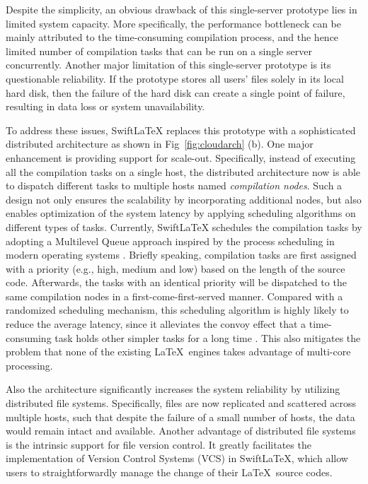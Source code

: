 \documentclass[sigconf]{acmart}
\begin{document}
Despite the simplicity, an obvious drawback of this single-server prototype lies in limited system capacity. More specifically, the performance bottleneck can be mainly attributed to the time-consuming compilation process, and the hence limited number of compilation tasks that can be run on a single server concurrently.
  Another major limitation of  this single-server prototype is its questionable reliability. If the prototype  stores all users' files solely in its local hard disk, then the failure of the hard disk can create a single point of failure, resulting in data loss or system unavailability. 



To address these issues, SwiftLaTeX replaces this prototype with a sophisticated distributed architecture as shown in Fig~\ref{fig:cloudarch} (b).
One major enhancement is providing support for scale-out. 
Specifically, instead of executing all the compilation tasks on a single host, the distributed architecture now is able to dispatch different tasks to multiple hosts named \textit{compilation nodes}. Such a design not only ensures the scalability by incorporating additional nodes, but also enables optimization of the system latency by applying scheduling algorithms on different types of tasks. 
Currently, SwiftLaTeX schedules the compilation tasks by adopting a Multilevel Queue approach inspired by the process scheduling in modern operating systems \cite{silberschatz2014operating} .
Briefly speaking, compilation tasks are first assigned with a priority (e.g., high, medium and low) based on the length of the source code.
Afterwards, the tasks with an identical priority will be dispatched to the same compilation nodes in a first-come-first-served manner. 
Compared with a randomized scheduling mechanism, this scheduling algorithm is highly likely to reduce the average latency, since it alleviates the convoy effect that a time-consuming task holds other simpler tasks for a long time \cite{lee2011improving}.
This also mitigates the problem that none of the existing \LaTeX\ engines takes advantage of multi-core processing.


Also the architecture significantly increases the system reliability by utilizing distributed file systems. 
Specifically, files are now replicated and scattered across multiple hosts, such that despite the failure of a small number of hosts, the data would remain intact and available.
Another advantage of distributed file systems is the intrinsic support for file version control. It greatly facilitates the implementation of Version Control Systems (VCS) in SwiftLaTeX, which allow users to straightforwardly manage the change of their \LaTeX\ source codes.
\end{document}
